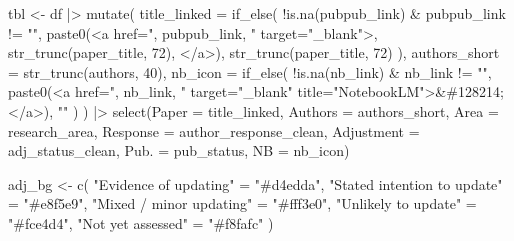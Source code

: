 \documentclass[
  11pt,
  letterpaper,
]{article}
\newenvironment{Shaded}{\begin{snugshade}}{\end{snugshade}}
\newcommand{\AttributeTok}[1]{\textcolor[rgb]{0.40,0.45,0.13}{#1}}
\newcommand{\DecValTok}[1]{\textcolor[rgb]{0.68,0.00,0.00}{#1}}
\newcommand{\FunctionTok}[1]{\textcolor[rgb]{0.28,0.35,0.67}{#1}}
\newcommand{\NormalTok}[1]{\textcolor[rgb]{0.00,0.23,0.31}{#1}}
\newcommand{\OtherTok}[1]{\textcolor[rgb]{0.00,0.23,0.31}{#1}}
\newcommand{\SpecialCharTok}[1]{\textcolor[rgb]{0.37,0.37,0.37}{#1}}
\newcommand{\StringTok}[1]{\textcolor[rgb]{0.13,0.47,0.30}{#1}}
\begin{document}
\begin{tcolorbox}
\begin{table}[H]
\begin{Shaded}
\begin{Highlighting}[]
\NormalTok{tbl }\OtherTok{\textless{}{-}}\NormalTok{ df }\SpecialCharTok{|\textgreater{}}
  \FunctionTok{mutate}\NormalTok{(}
    \AttributeTok{title\_linked =} \FunctionTok{if\_else}\NormalTok{(}
      \SpecialCharTok{!}\FunctionTok{is.na}\NormalTok{(pubpub\_link) }\SpecialCharTok{\&}\NormalTok{ pubpub\_link }\SpecialCharTok{!=} \StringTok{""}\NormalTok{,}
      \FunctionTok{paste0}\NormalTok{(}\StringTok{\textquotesingle{}\textless{}a href="\textquotesingle{}}\NormalTok{, pubpub\_link, }\StringTok{\textquotesingle{}" target="\_blank"\textgreater{}\textquotesingle{}}\NormalTok{,}
             \FunctionTok{str\_trunc}\NormalTok{(paper\_title, }\DecValTok{72}\NormalTok{), }\StringTok{\textquotesingle{}\textless{}/a\textgreater{}\textquotesingle{}}\NormalTok{),}
      \FunctionTok{str\_trunc}\NormalTok{(paper\_title, }\DecValTok{72}\NormalTok{)}
\NormalTok{    ),}
    \AttributeTok{authors\_short =} \FunctionTok{str\_trunc}\NormalTok{(authors, }\DecValTok{40}\NormalTok{),}
    \AttributeTok{nb\_icon =} \FunctionTok{if\_else}\NormalTok{(}
      \SpecialCharTok{!}\FunctionTok{is.na}\NormalTok{(nb\_link) }\SpecialCharTok{\&}\NormalTok{ nb\_link }\SpecialCharTok{!=} \StringTok{""}\NormalTok{,}
      \FunctionTok{paste0}\NormalTok{(}\StringTok{\textquotesingle{}\textless{}a href="\textquotesingle{}}\NormalTok{, nb\_link, }\StringTok{\textquotesingle{}" target="\_blank" title="NotebookLM"\textgreater{}\&\#128214;\textless{}/a\textgreater{}\textquotesingle{}}\NormalTok{),}
      \StringTok{""}
\NormalTok{    )}
\NormalTok{  ) }\SpecialCharTok{|\textgreater{}}
  \FunctionTok{select}\NormalTok{(}\AttributeTok{Paper =}\NormalTok{ title\_linked, }\AttributeTok{Authors =}\NormalTok{ authors\_short,}
         \AttributeTok{Area =}\NormalTok{ research\_area, }\AttributeTok{Response =}\NormalTok{ author\_response\_clean,}
         \AttributeTok{Adjustment =}\NormalTok{ adj\_status\_clean, }\StringTok{\textasciigrave{}}\AttributeTok{Pub.}\StringTok{\textasciigrave{}} \OtherTok{=}\NormalTok{ pub\_status, }\AttributeTok{NB =}\NormalTok{ nb\_icon)}

\NormalTok{adj\_bg }\OtherTok{\textless{}{-}} \FunctionTok{c}\NormalTok{(}
  \StringTok{"Evidence of updating"}        \OtherTok{=} \StringTok{"\#d4edda"}\NormalTok{,}
  \StringTok{"Stated intention to update"}  \OtherTok{=} \StringTok{"\#e8f5e9"}\NormalTok{,}
  \StringTok{"Mixed / minor updating"}      \OtherTok{=} \StringTok{"\#fff3e0"}\NormalTok{,}
  \StringTok{"Unlikely to update"}          \OtherTok{=} \StringTok{"\#fce4d4"}\NormalTok{,}
  \StringTok{"Not yet assessed"}            \OtherTok{=} \StringTok{"\#f8fafc"}
\NormalTok{)}


\end{Highlighting}
\end{Shaded}
\end{table}
\end{tcolorbox}
\end{document}
